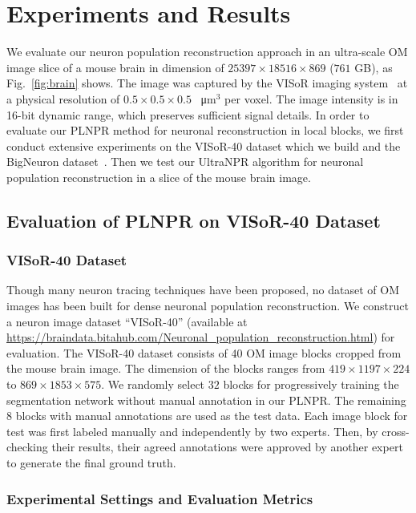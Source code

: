 \section{Experiments and Results}
\label{sec:experiments}

We evaluate our neuron population reconstruction approach in an ultra-scale OM image slice of a mouse brain in dimension of $25397\times 18516\times 869$ ($761$ GB), as Fig.~\ref{fig:brain} shows.
%
The image was captured by the VISoR imaging system~\cite{Wang2019} at a physical resolution of $0.5 \times0.5 \times 0.5$ \SI{}{\micro\metre}$^3$ per voxel. 
%
The image intensity is in 16-bit dynamic range, which preserves sufficient signal details.
In order to evaluate our PLNPR method for neuronal reconstruction in local blocks, we first conduct extensive experiments on the VISoR-40 dataset which we build and the BigNeuron dataset~\cite{peng2015}. 
%
Then we test our UltraNPR algorithm for neuronal population reconstruction in a slice of the mouse brain image.

\subsection{Evaluation of PLNPR on VISoR-40 Dataset}
\label{sec:exp_PLNPR_VISoR}

\subsubsection{VISoR-40 Dataset}
Though many neuron tracing techniques have been proposed, no dataset of OM images has been built for dense neuronal population reconstruction.
We construct a neuron image dataset ``VISoR-40'' (available at \url{https://braindata.bitahub.com/Neuronal_population_reconstruction.html}) for evaluation. 
The VISoR-40 dataset consists of 40 OM image blocks cropped from the mouse brain image. The dimension of the blocks ranges from $419 \times1197 \times 224$ to $869 \times1853 \times 575$.
%
We randomly select $32$ blocks for progressively training the segmentation network without manual annotation in our PLNPR.
%
The remaining 8 blocks with manual annotations are used as the test data.
Each image block for test was first labeled manually and independently by two experts. Then, by cross-checking their results, their agreed annotations were approved by another expert to generate the final ground truth.

\subsubsection{Experimental Settings and Evaluation Metrics}


